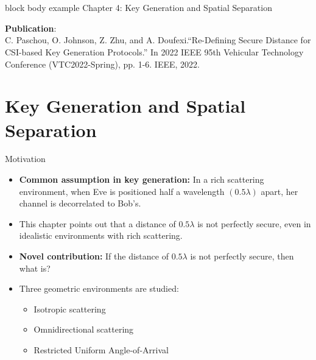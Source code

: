 \section*{}
\begin{frame}{}
\begin{beamercolorbox}[colsep=1.5pt,rounded=true,shadow=true]{block body example}
    \huge{Chapter 4: Key Generation and Spatial Separation}
\end{beamercolorbox}
\vspace{2cm}
\textbf{Publication}:\\
C. Paschou, O. Johnson, Z. Zhu, and A. Doufexi.``Re-Defining Secure Distance for CSI-based Key Generation Protocols.'' In 2022 IEEE 95th Vehicular Technology Conference (VTC2022-Spring), pp. 1-6. IEEE, 2022.




\end{frame}


\section{Key Generation and Spatial Separation}
\begin{frame}{Motivation}
\begin{itemize}
\item \textbf{Common assumption in key generation:} In a rich scattering environment, when Eve is positioned half a wavelength $(0.5\lambda)$ apart, her channel is decorrelated to Bob's.
    \item This chapter points out that a distance of $0.5\lambda$ is not perfectly secure, even in idealistic environments with rich scattering.
    \item \textbf{Novel contribution:} If the distance of $0.5\lambda$ is not perfectly secure, then what is?
    \item Three geometric environments are studied:
    \begin{itemize}
        \item Isotropic scattering
        \item Omnidirectional scattering
        \item Restricted Uniform Angle-of-Arrival
    \end{itemize}
\end{itemize}
\end{frame}

